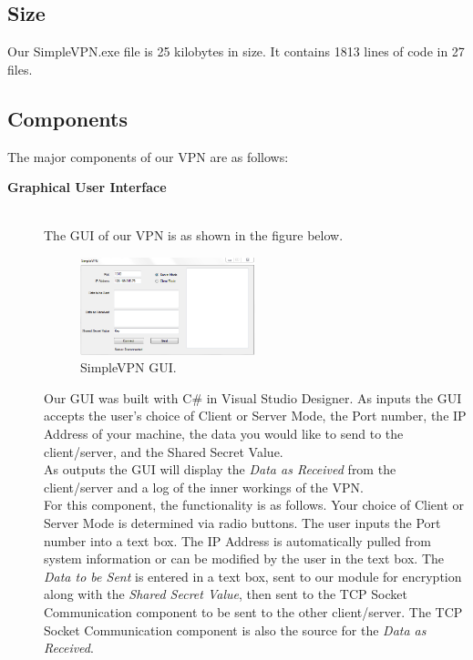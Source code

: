 \documentclass[journal]{IEEEtran}
\begin{document}
\subsection*{Size}
Our SimpleVPN.exe file is 25 kilobytes in size. It contains 1813 lines of code in 27 files.
\subsection*{Components}
The major components of our VPN are as follows:
\begin{description}
	\item[\bfseries Graphical User Interface] \hfill \\
	The GUI of our VPN is as shown in the figure below.
	\begin{figure}[H]
		\centering
		\caption{SimpleVPN GUI.}
		\includegraphics[width=0.5\textwidth]{GUI.png}
	\end{figure}
	Our GUI was built with C\# in Visual Studio Designer.
	As inputs the GUI accepts the user's choice of Client or Server Mode, the Port number, the IP Address of your machine, the data you would like to send to the client/server, and the Shared Secret Value.\\
	As outputs the GUI will display the \emph{Data as Received} from the client/server and a log of the inner workings of the VPN.\\%
	For this component, the functionality is as follows. Your choice of Client or Server Mode is determined via radio buttons. The user inputs the Port number into a text box. The IP Address is automatically pulled from system information or can be modified by the user in the text box. The \emph{Data to be Sent} is entered in a text box, sent to our module for encryption along with the \emph{Shared Secret Value}, then sent to the TCP Socket Communication component to be sent to the other client/server.  The TCP Socket Communication component is also the source for the \emph{Data as Received}. %
	

\end{description}
\end{document}
